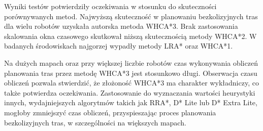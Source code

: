 Wyniki testów potwierdziły oczekiwania w stosunku do skuteczności porównywanych metod.
Najwyższą skuteczność w planowaniu bezkolizyjnych tras dla wielu robotów uzyskała autorska metoda WHCA*3.
Brak zastosowania skalowania okna czasowego skutkował niższą skutecznością metody WHCA*2.
W badanych środowiskach najgorzej wypadły metody LRA* oraz WHCA*1.


Na dużych mapach oraz przy większej liczbie robotów czas wykonywania obliczeń planowania tras przez metodę WHCA*3 jest stosunkowo długi.
Obserwacja czasu obliczeń pozwala stwierdzić, że złożoność WHCA*3 ma charakter wykładniczy, co także potwierdza oczekiwania.
Zastosowanie do wyznaczania wartości heurystyki innych, wydajniejszych algorytmów takich jak RRA*, D* Lite lub D* Extra Lite, mogłoby zmniejszyć czas obliczeń, przyspieszając proces planowania bezkolizyjnych tras, w szczególności na większych mapach.



